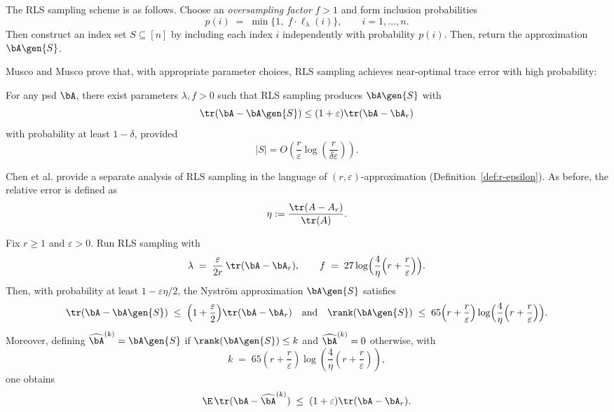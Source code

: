 The RLS sampling scheme is as follows. Choose an \emph{oversampling factor} $f>1$ and form inclusion probabilities
\[
p(i) \;=\; \min\{1,\; f\cdot \ell_\lambda(i)\},\qquad i=1,\dots,n.
\]
Then construct an index set $S\subseteq[n]$ by including each index $i$ independently with
probability $p(i)$. Then, return the approximation $\bA\gen{S}$.

Musco and Musco \cite{musco_recursive_2017} prove that, with appropriate parameter choices, RLS sampling achieves near-optimal trace
error with high probability:

\begin{theorem}
\label{thm:rls-musco}
For any psd $\bA$, there exist parameters $\lambda,f>0$ such that RLS sampling produces $\bA\gen{S}$ with
\[
\tr(\bA-\bA\gen{S})\leq (1+\varepsilon)\tr(\bA-\bA_r)
\]
with probability at least $1-\delta$, provided
\[
|S| = O\left(\frac{r}{\varepsilon}\log\!\left(\frac{r}{\delta\varepsilon}\right)\right).
\]
\end{theorem}

Chen et al. \cite{chen_randomly_2025} provide a separate analysis of RLS sampling in the language of $(r, \varepsilon)$-approximation (Definition~\ref{def:r-epsilon}). As before, the relative error is defined as
\[
\eta := \frac{\tr(A-A_r)}{\tr(A)}.
\]

\begin{theorem}
Fix $r\geq 1$ and $\varepsilon>0$. Run RLS sampling with
\[
\lambda \;=\; \frac{\varepsilon}{2r}\,\tr(\bA-\bA_r),
\qquad
f \;=\; 27\log\!\Big(\frac{4}{\eta}\Big(r+\frac{r}{\varepsilon}\Big)\Big).
\]
Then, with probability at least $1-\varepsilon\eta/2$, the Nystr\"om approximation $\bA\gen{S}$ satisfies
\[
\tr(\bA-\bA\gen{S})\;\le\;\Big(1+\frac{\varepsilon}{2}\Big)\tr(\bA-\bA_r)
\quad\text{and}\quad
\rank(\bA\gen{S})\;\le\;
65\Big(r+\frac{r}{\varepsilon}\Big)\log\!\Big(\frac{4}{\eta}\Big(r+\frac{r}{\varepsilon}\Big)\Big).
\]
Moreover, defining $\widehat\bA^{(k)} = \bA\gen{S}$ if $\rank(\bA\gen{S})\le k$
and $\widehat\bA^{(k)}=0$ otherwise, with
\[
k \;=\;
65\left(r+\frac{r}{\varepsilon}\right)\log\!\left(\frac{4}{\eta}\left(r+\frac{r}{\varepsilon}\right)\right),
\]
one obtains
\[
\E\,\tr(\bA- \widehat\bA^{(k)})\;\le\;(1+\varepsilon)\tr(\bA-\bA_r).
\]
\end{theorem}
